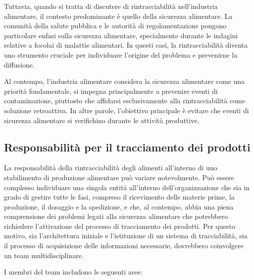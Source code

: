 Tuttavia, quando si tratta di discutere di rintracciabilità nell'industria alimentare, il contesto predominante è quello della sicurezza alimentare. La comunità della salute pubblica e le autorità di regolamentazione pongono particolare enfasi sulla sicurezza alimentare, specialmente durante le indagini relative a focolai di malattie alimentari. In questi casi, la rintracciabilità diventa uno strumento cruciale per individuare l'origine del problema e prevenirne la diffusione.

Al contempo, l'industria alimentare considera la sicurezza alimentare come una priorità fondamentale, si impegna principalmente a prevenire eventi di contaminazione, piuttosto che affidarsi esclusivamente alla rintracciabilità come soluzione retroattiva. In altre parole, l'obiettivo principale è evitare che eventi di sicurezza alimentare si verifichino durante le attività produttive.

\subsection{Responsabilità per il tracciamento dei prodotti}

La responsabilità della rintracciabilità degli alimenti all'interno di uno stabilimento di produzione alimentare può variare notevolmente. Può essere complesso individuare una singola entità all'interno dell'organizzazione che sia in grado di gestire tutte le fasi, compreso il ricevimento delle materie prime, la produzione, il dosaggio e la spedizione, e che, al contempo, abbia una piena comprensione dei problemi legati alla sicurezza alimentare che potrebbero richiedere l'attivazione del processo di tracciamento dei prodotti. Per questo motivo, sia l'architettura iniziale e l'istituzione di un sistema di tracciabilità, sia il processo di acquisizione delle informazioni necessarie, dovrebbero coinvolgere un team multidisciplinare.

I membri del team includono le seguenti aree:

